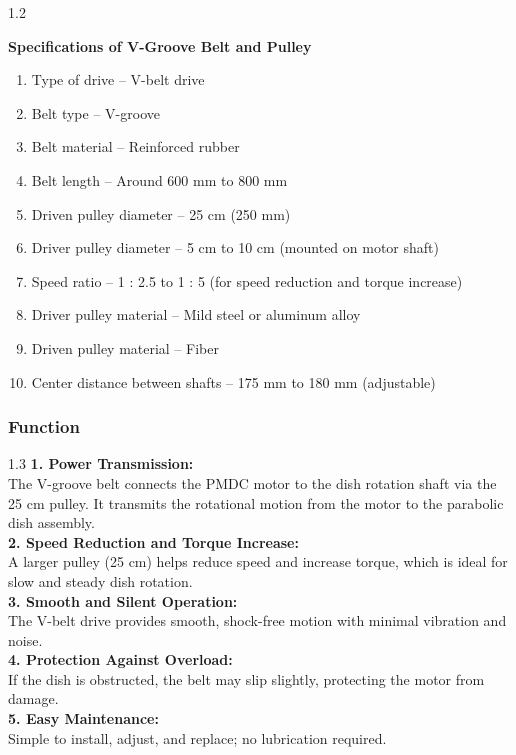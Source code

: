 \documentclass[12pt,a4paper]{article}
\begin{document}
\noindent
\begin{spacing}{1.2}
{\fontsize{10.2}{14.5}\selectfont
\textbf{Specifications of V-Groove Belt and Pulley}
\begin{enumerate}[leftmargin=8mm, itemsep=2mm]
  \item Type of drive -- V-belt drive
  \item Belt type -- V-groove
  \item Belt material -- Reinforced rubber
  \item Belt length -- Around 600 mm to 800 mm
  \item Driven pulley diameter -- 25 cm (250 mm)
  \item Driver pulley diameter -- 5 cm to 10 cm (mounted on motor shaft)
  \item Speed ratio -- 1 : 2.5 to 1 : 5 (for speed reduction and torque increase)
  \item Driver pulley material -- Mild steel or aluminum alloy
  \item Driven pulley material -- Fiber
  \item Center distance between shafts -- 175 mm to 180 mm (adjustable)
\end{enumerate}
}
\end{spacing}
\clearpage




\subsubsection*{Function}
\vspace{3mm}

\noindent
\begin{spacing}{1.3}
{\fontsize{10.5}{15.5}\selectfont
\textbf{1. Power Transmission:}\\
The V-groove belt connects the PMDC motor to the dish rotation shaft via the 25 cm pulley. It transmits the rotational motion from the motor to the parabolic dish assembly.\\[4mm]
\textbf{2. Speed Reduction and Torque Increase:}\\
A larger pulley (25 cm) helps reduce speed and increase torque, which is ideal for slow and steady dish rotation.\\[4mm]
\textbf{3. Smooth and Silent Operation:}\\
The V-belt drive provides smooth, shock-free motion with minimal vibration and noise.\\[4mm]
\textbf{4. Protection Against Overload:}\\
If the dish is obstructed, the belt may slip slightly, protecting the motor from damage.\\[4mm]
\textbf{5. Easy Maintenance:}\\
Simple to install, adjust, and replace; no lubrication required.
}
\end{spacing}
\clearpage
\end{document}
